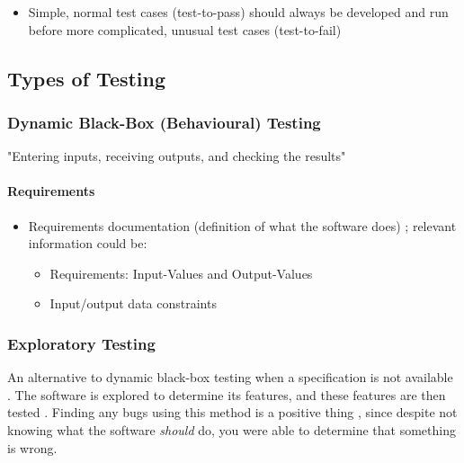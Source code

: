 \begin{itemize}
      \item Simple, normal test cases (test-to-pass) should always be developed
            and run before more complicated, unusual test cases (test-to-fail)
            \cite[p.~66]{patton_software_2006}
\end{itemize}

\subsection{Types of Testing}

\subsubsection{Dynamic Black-Box (Behavioural) Testing
      \cite[p.~64-65]{patton_software_2006}}

"Entering inputs, receiving outputs, and checking the results"
\cite[p.~64]{patton_software_2006}

\paragraph{Requirements}
\begin{itemize}
      \item Requirements documentation (definition of what the software does)
            \cite[p.~64]{patton_software_2006}; relevant information could be:
            \begin{itemize}
                  \item Requirements: Input-Values and Output-Values
                  \item Input/output data constraints
            \end{itemize}
\end{itemize}

\subsubsection{Exploratory Testing \cite[p.~65]{patton_software_2006}}

An alternative to dynamic black-box testing when a specification is not
available \cite[p.~65]{patton_software_2006}. The software is explored to
determine its features, and these features are then tested
\cite[p.~65]{patton_software_2006}. Finding any bugs using this method is a
positive thing \cite[p.~65]{patton_software_2006}, since despite not knowing
what the software \emph{should} do, you were able to determine that something
is wrong.

